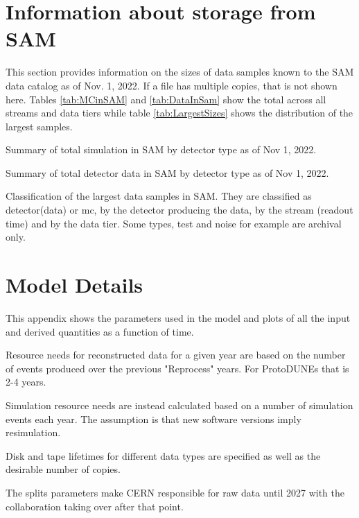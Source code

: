 \documentclass[12pt]{article}
\begin{document}


\clearpage
\appendix

\section{Information about storage from SAM}\label{storage}

This section provides information on the sizes of data samples known to the SAM data catalog as of Nov. 1, 2022.  If a file has multiple copies, that is not shown here.  Tables \ref{tab:MCinSAM} and \ref{tab:DataInSam} show the total across all streams and data tiers while table \ref{tab:LargestSizes} shows the distribution of the largest samples.  


\begin{table}[ht]
 \centering{}
\caption{Summary  of total simulation in SAM by detector type as of Nov 1, 2022.} 
\label{tab:MCinSAM}
\end{table}

\begin{table}[ht]
 \centering{}
 \caption{Summary  of total detector data in SAM by detector type as of Nov 1, 2022.}
 \label{tab:DataInSam}
\end{table}



\begin{table}[ht]
 \centering{}
\caption{Classification of the largest data samples in SAM.  They are classified as detector(data) or mc, by the detector producing the data, by the stream (readout time) and by the data tier.  Some types, test and noise for example are archival only.  }
 \label{tab:LargestSizes}
\end{table}
\clearpage
\section{Model Details}

This appendix shows the parameters used in the model and plots of all the input and derived quantities as a function of time. 

Resource needs for reconstructed data for a given year are based on the number of events produced over the previous "Reprocess" years.   For ProtoDUNEs that is 2-4 years. 

Simulation resource needs are instead calculated based on a number of simulation events each year. The assumption is that new software versions imply resimulation.

Disk and tape lifetimes for different data types are specified as well as the desirable number of copies. 

The splits parameters make CERN responsible for raw data until 2027 with the collaboration taking over after that point. 


\end{document}
